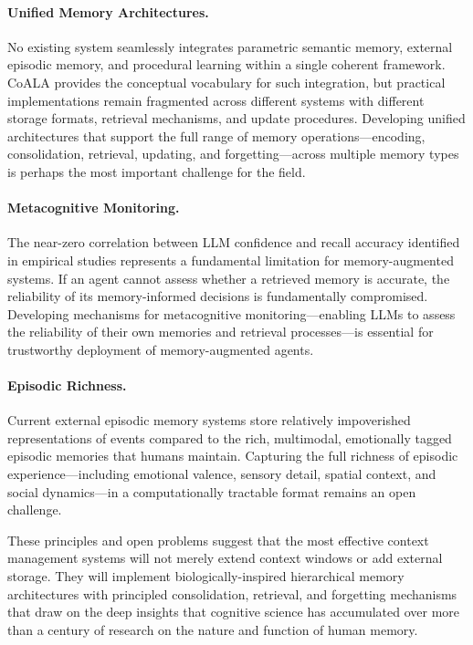 \documentclass[11pt,letterpaper]{article}
\begin{document}
\paragraph{Unified Memory Architectures.} No existing system seamlessly integrates parametric semantic memory, external episodic memory, and procedural learning within a single coherent framework. CoALA provides the conceptual vocabulary for such integration, but practical implementations remain fragmented across different systems with different storage formats, retrieval mechanisms, and update procedures. Developing unified architectures that support the full range of memory operations---encoding, consolidation, retrieval, updating, and forgetting---across multiple memory types is perhaps the most important challenge for the field.

\paragraph{Metacognitive Monitoring.} The near-zero correlation between LLM confidence and recall accuracy identified in empirical studies represents a fundamental limitation for memory-augmented systems. If an agent cannot assess whether a retrieved memory is accurate, the reliability of its memory-informed decisions is fundamentally compromised. Developing mechanisms for metacognitive monitoring---enabling LLMs to assess the reliability of their own memories and retrieval processes---is essential for trustworthy deployment of memory-augmented agents.

\paragraph{Episodic Richness.} Current external episodic memory systems store relatively impoverished representations of events compared to the rich, multimodal, emotionally tagged episodic memories that humans maintain. Capturing the full richness of episodic experience---including emotional valence, sensory detail, spatial context, and social dynamics---in a computationally tractable format remains an open challenge.

These principles and open problems suggest that the most effective context management systems will not merely extend context windows or add external storage. They will implement biologically-inspired hierarchical memory architectures with principled consolidation, retrieval, and forgetting mechanisms that draw on the deep insights that cognitive science has accumulated over more than a century of research on the nature and function of human memory.
\end{document}
